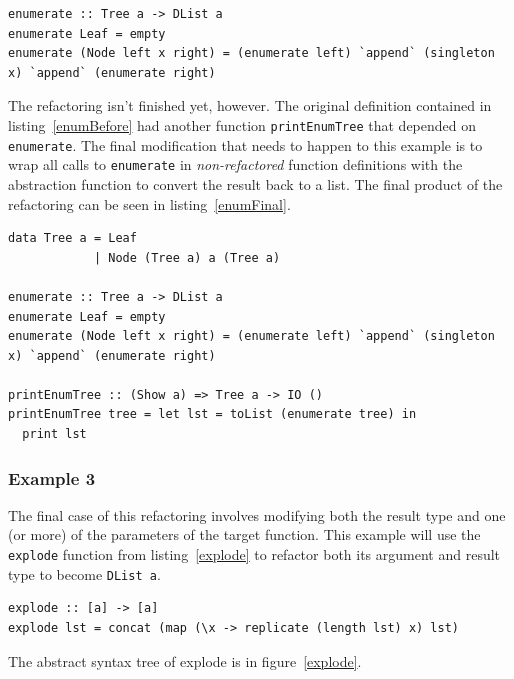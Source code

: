 \begin{lstlisting}[caption={The refactored definition of \texttt{enumerate}}, label=enumRef]
enumerate :: Tree a -> DList a
enumerate Leaf = empty
enumerate (Node left x right) = (enumerate left) `append` (singleton x) `append` (enumerate right)
\end{lstlisting}

The refactoring isn't finished yet, however. The original definition contained in listing~\ref{enumBefore} had another function \texttt{printEnumTree} that depended on \texttt{enumerate}. The final modification that needs to happen to this example is to wrap all calls to \texttt{enumerate} in \textit{non-refactored} function definitions with the abstraction function to convert the result back to a list. The final product of the refactoring can be seen in listing~\ref{enumFinal}.

\begin{lstlisting}[caption={The final product of the refactoring}, label=enumFinal]
data Tree a = Leaf
            | Node (Tree a) a (Tree a)

enumerate :: Tree a -> DList a
enumerate Leaf = empty
enumerate (Node left x right) = (enumerate left) `append` (singleton x) `append` (enumerate right)

printEnumTree :: (Show a) => Tree a -> IO ()
printEnumTree tree = let lst = toList (enumerate tree) in
  print lst
\end{lstlisting}

\subsubsection{Example 3}

The final case of this refactoring involves modifying both the result type and one (or more) of the parameters of the target function. This example will use the \texttt{explode} function from listing~\ref{explode} to refactor both its argument and result type to become \texttt{DList a}.

\begin{lstlisting}[caption={The initial definition of \texttt{explode}},label=explode]
explode :: [a] -> [a]
explode lst = concat (map (\x -> replicate (length lst) x) lst)
\end{lstlisting}

The abstract syntax tree of explode is in figure~\ref{explode}.

